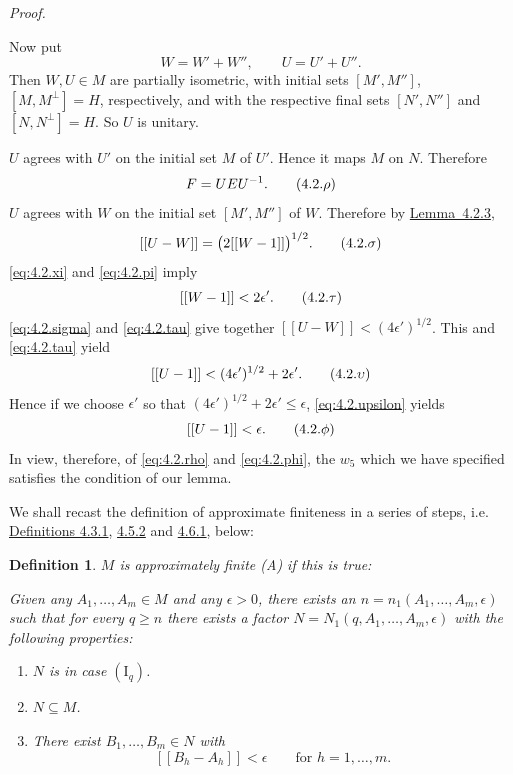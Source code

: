 \documentclass[b5paper,twoside]{article}
\newcommand{\lemref}[2]{\hyperref[#1]{\mbox{Lemma~#2}}}
\theoremstyle{mvnplain}
\newtheorem{definition}{Definition}[section]
\renewenvironment{proof}[1][Proof]{%
  \par\addvspace{0.35\baselineskip}%
  \noindent\textit{#1.}\ \normalfont\ignorespaces
}{%
  \par\addvspace{0.35\baselineskip}%
}
\newcommand{\M}{\mathbf M}
\newcommand{\N}{\mathbf N}
\newcommand{\Hilbert}{\mathfrak H}
\newcommand{\Metric}[1]{\left[\!\left[#1\right]\!\right]}
\def\M{M}%
\def\N{N}%
\def\Hilbert{H}%
\def\Metric#1{[[#1]]}%
\def\mathfrak#1{#1}%
\begin{document}
\begin{proof}
Now put
\[
  W=W'+W'',\qquad U=U'+U''.
\]
Then \(W,U\in\M\) are partially isometric, with initial sets
\([\mathfrak M',\mathfrak M'']\),
\([\mathfrak M,\mathfrak M^{\perp}]=\Hilbert\), respectively, and with the
respective final sets \([\mathfrak N',\mathfrak N'']\) and
\([\mathfrak N,\mathfrak N^{\perp}]=\Hilbert\). So \(U\) is unitary.

\(U\) agrees with \(U'\) on the initial set \(\mathfrak M\) of \(U'\). Hence
it maps \(\mathfrak M\) on \(\mathfrak N\). Therefore
\begin{equation}\label{eq:4.2.rho}
  F=UEU^{-1}.
  \tag{4.2.\ensuremath{\rho}}
\end{equation}
\(U\) agrees with \(W\) on the initial set
\([\mathfrak M',\mathfrak M'']\) of \(W\). Therefore by
\lemref{lem:4.2.3}{4.2.3},
\begin{equation}\label{eq:4.2.sigma}
  \Metric{U-W}=\bigl(2\Metric{W-1}\bigr)^{1/2}.
  \tag{4.2.\ensuremath{\sigma}}
\end{equation}
\eqref{eq:4.2.xi} and \eqref{eq:4.2.pi} imply
\begin{equation}\label{eq:4.2.tau}
  \Metric{W-1}<2\epsilon'.
  \tag{4.2.\ensuremath{\tau}}
\end{equation}
\eqref{eq:4.2.sigma} and \eqref{eq:4.2.tau} give together
\(\Metric{U-W}<(4\epsilon')^{1/2}\). This and \eqref{eq:4.2.tau} yield
\begin{equation}\label{eq:4.2.upsilon}
  \Metric{U-1}<(4\epsilon')^{1/2}+2\epsilon'.
  \tag{4.2.\ensuremath{\upsilon}}
\end{equation}
Hence if we choose \(\epsilon'\) so that
\((4\epsilon')^{1/2}+2\epsilon'\le\epsilon\),
\eqref{eq:4.2.upsilon} yields
\begin{equation}\label{eq:4.2.phi}
  \Metric{U-1}<\epsilon.
  \tag{4.2.\ensuremath{\phi}}
\end{equation}
In view, therefore, of \eqref{eq:4.2.rho} and \eqref{eq:4.2.phi}, the \(w_5\)
which we have specified satisfies the condition of our lemma.
\end{proof}

We shall recast the definition of approximate finiteness in a series of steps,
i.e. \hyperref[def:4.3.1]{Definitions 4.3.1},
\hyperref[def:4.5.2]{4.5.2} and \hyperref[def:4.6.1]{4.6.1}, below:

\begin{definition}\label{def:4.3.1}
\(\M\) is approximately finite (A) if this is true:

Given any \(A_1,\ldots,A_m\in\M\) and any \(\epsilon>0\), there exists an
\(n=n_1(A_1,\ldots,A_m,\epsilon)\) such that for every \(q\ge n\) there
exists a factor
\(\N=\N_1(q,A_1,\ldots,A_m,\epsilon)\) with the following properties:
\begin{enumerate}[label=\((\roman*)\)]
\item \(\N\) is in case \((\mathrm I_q)\).
\item \(\N\subseteq\M\).
\item There exist \(B_1,\ldots,B_m\in\N\) with
\[
  \Metric{B_h-A_h}<\epsilon\qquad\text{for }h=1,\ldots,m.
\]
\end{enumerate}
\end{definition}
\end{document}
